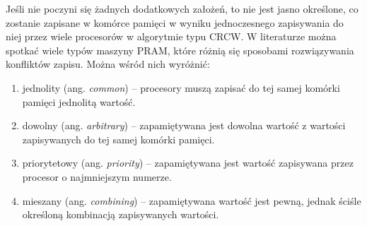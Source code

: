 Jeśli nie poczyni się żadnych dodatkowych założeń, to nie jest jasno określone, co zostanie zapisane w komórce pamięci w wyniku jednoczesnego zapisywania do niej przez wiele procesorów w algorytmie typu CRCW. W literaturze można spotkać wiele typów maszyny PRAM, które różnią się sposobami rozwiązywania konfliktów zapisu. Można wśród nich wyróżnić\cite{Cormen94}:
\begin{enumerate}
\item jednolity (ang. \emph{common}) – procesory muszą zapisać do tej samej komórki pamięci jednolitą wartość.
\item dowolny (ang. \emph{arbitrary}) – zapamiętywana jest dowolna wartość z wartości zapisywanych do tej samej komórki pamięci.
\item priorytetowy (ang. \emph{priority}) – zapamiętywana jest wartość zapisywana przez procesor o najmniejszym numerze.
\item mieszany (ang. \emph{combining}) – zapamiętywana wartość jest pewną, jednak ściśle określoną kombinacją zapisywanych wartości.
\end{enumerate}

